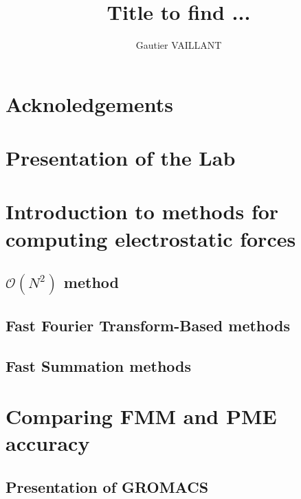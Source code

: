 \documentclass[12pt,twoside,a4paper]{report}
\title{Title to find ...}
\author{Gautier VAILLANT}
\date{}
\begin{document}
\maketitle

\chapter*{Acknoledgements}


\tableofcontents

\chapter*{Presentation of the Lab}

\chapter{Introduction to methods for computing electrostatic forces}

\section{$\mathcal{O}(N^2)$ method }
\section{Fast Fourier Transform-Based methods}
\section{Fast Summation methods}

\chapter{Comparing FMM and PME accuracy}

\section{Presentation of GROMACS}
\end{document}
